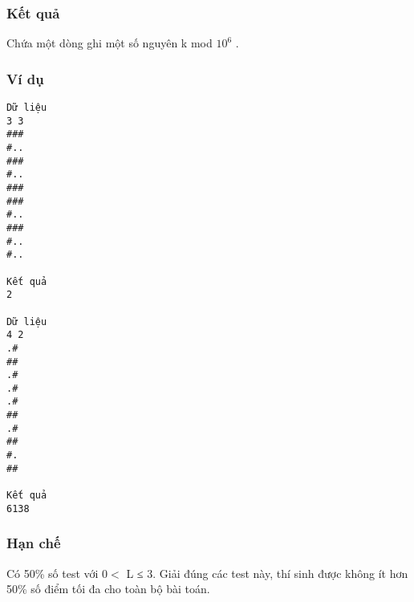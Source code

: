 \subsubsection{   Kết quả  }

   Chứa một dòng ghi một số nguyên k mod $10^{6}$   .  

\subsubsection{   Ví dụ  }
\begin{verbatim}
Dữ liệu
3 3
###
#..
###
#..
###
###
#..
###
#..
#..	

Kết quả
2

Dữ liệu
4 2
.#
##
.#
.#
.#
##
.#
##
#.
##	

Kết quả
6138
\end{verbatim}

\subsubsection{   Hạn chế  }

   Có 50\% số test với 0$<$ L ≤ 3. Giải đúng các test này, thí sinh được không ít hơn 50\% số điểm tối đa cho toàn bộ bài toán.  
